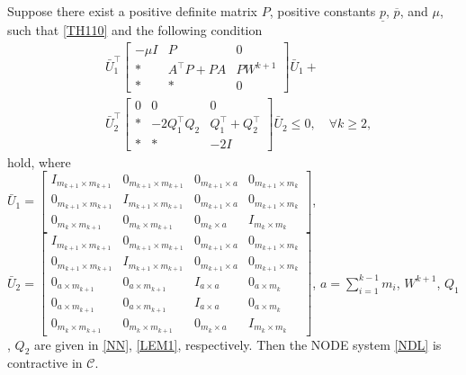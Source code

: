 \documentclass[10pt,a4paper]{amsart}
\newcommand{\bbm}[1]{\left[\begin{matrix} #1 \end{matrix}\right]}
\begin{document}
\begin{theorem}\label{theorem11}
Suppose there exist a positive definite matrix $P$, positive constants $\underline{p}$, $\overline{p}$, and $\mu$, such that \eqref{TH110} and the following condition
\begin{equation}\label{TH121}
\begin{aligned}
&\bar{U}_1^\top
\bbm{-\mu I&P&0\\
   \ast&  A^\top P+PA &PW^{k+1}\\
  \ast& \ast & 0
}\bar{U}_1+\\&\bar{U}_2^\top\bbm{0&0&0\\\ast&
 -2Q_1^\top Q_2&Q_1^\top+Q_2^\top
 \\\ast&
\ast&-2I
}\bar{U}_2\leq 0, \quad\forall k\geq 2,
\end{aligned}
\end{equation}
hold, where \\$\bar{U}_1=\bbm{I_{m_{k+1}\times m_{k+1}} &0_{m_{k+1}\times m_{k+1}}&0_{m_{k+1}\times a} &0_{m_{k+1}\times m_{k}}\\0_{m_{k+1}\times m_{k+1}}&I_{m_{k+1}\times m_{k+1}}&0_{m_{k+1}\times a}&0_{m_{k+1}\times m_{k}}\\0_{m_{k}\times m_{k+1}}&0_{m_{k}\times m_{k+1}}&0_{m_{k}\times a}&I_{m_{k}\times m_{k}}}$, $\bar{U}_2=\bbm{I_{m_{k+1}\times m_{k+1}} &0_{m_{k+1}\times m_{k+1}}&0_{m_{k+1}\times a}&0_{m_{k+1}\times m_{k}}\\0_{m_{k+1}\times m_{k+1}}&I_{m_{k+1}\times m_{k+1}} &0_{m_{k+1}\times a}&0_{m_{k+1}\times m_{k}}\\0_{a\times m_{k+1}}&0_{a\times m_{k+1}}&I_{a\times a}&0_{a\times m_{k}}\\0_{a\times m_{k+1}}&0_{a\times m_{k+1}}&I_{a\times a}&0_{a\times m_{k}}\\0_{m_{k}\times m_{k+1}}&0_{m_{k}\times m_{k+1}}&0_{m_{k}\times a}&I_{m_{k}\times m_{k}}}$, $a=\sum_{i=1}^{k-1}m_i$, $W^{k+1}$, $Q_1$, $Q_2$ are given in \eqref{NN}, \eqref{LEM1}, respectively. Then the NODE system \eqref{NDL} is contractive in $\mathcal{C}$.
\end{theorem}
\end{document}

